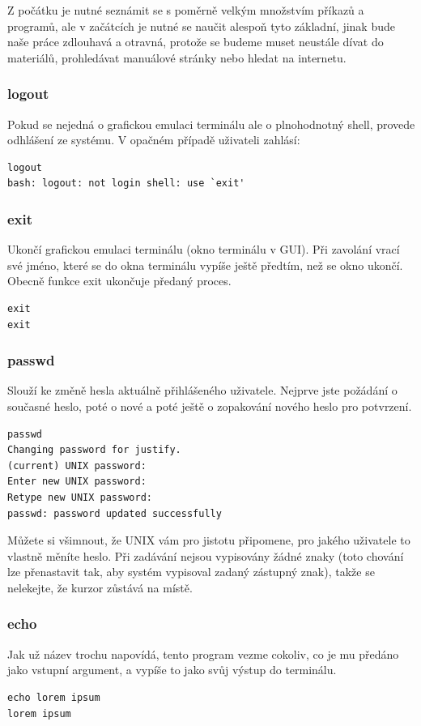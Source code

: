 \documentclass{article}
\begin{document}
Z počátku je nutné seznámit se s poměrně velkým množstvím příkazů a programů, ale v začátcích je nutné se naučit alespoň tyto základní, jinak bude naše práce zdlouhavá a otravná, protože se budeme muset neustále dívat do materiálů, prohledávat manuálové stránky nebo hledat na internetu.

\subsubsection{logout}
Pokud se nejedná o grafickou emulaci terminálu ale o plnohodnotný shell, provede odhlášení ze systému. V opačném případě uživateli zahlásí:
\begin{verbatim}
logout
bash: logout: not login shell: use `exit'
\end{verbatim}

\subsubsection{exit}
Ukončí grafickou emulaci terminálu (okno terminálu v GUI). Při zavolání vrací své jméno, které se do okna terminálu vypíše ještě předtím, než se okno ukončí. Obecně funkce exit ukončuje předaný proces.
\begin{verbatim}
exit
exit
\end{verbatim}

\subsubsection{passwd}
Slouží ke změně hesla aktuálně přihlášeného uživatele. Nejprve jste požádání o současné heslo, poté o nové a poté ještě o zopakování nového heslo pro potvrzení.
\begin{verbatim}
passwd
Changing password for justify.
(current) UNIX password: 
Enter new UNIX password: 
Retype new UNIX password: 
passwd: password updated successfully
\end{verbatim}
Můžete si všimnout, že UNIX vám pro jistotu připomene, pro jakého uživatele to vlastně měníte heslo. Při zadávání nejsou vypisovány žádné znaky (toto chování lze přenastavit tak, aby systém vypisoval zadaný zástupný znak), takže se nelekejte, že kurzor zůstává na místě.

\subsubsection{echo}
Jak už název trochu napovídá, tento program vezme cokoliv, co je mu předáno jako vstupní argument, a vypíše to jako svůj výstup do terminálu.
\begin{verbatim}
echo lorem ipsum
lorem ipsum
\end{verbatim}
\end{document}
